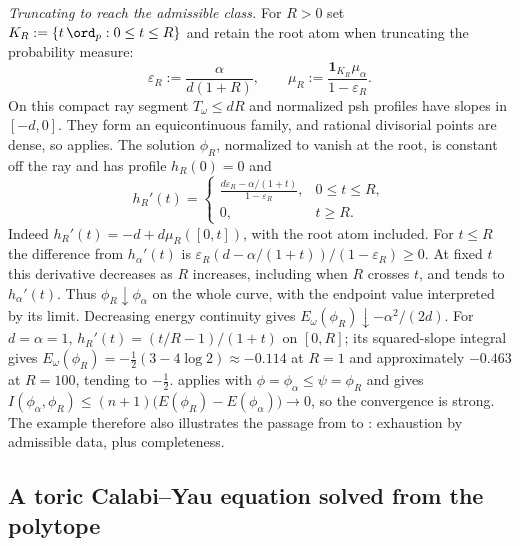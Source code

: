 \begin{example}[Solving $\MA_\omega(\phi)=\mu$ on $\mathbf P^1$ by hand]
\emph{Truncating to reach the admissible class.} For $R>0$ set
$K_R:=\{t\,\ord_p:0\le t\le R\}$ and retain the root atom when
truncating the probability measure:
\[
 \varepsilon_R:=\frac{\alpha}{d(1+R)},\qquad
 \mu_R:=\frac{\mathbf1_{K_R}\mu_\alpha}{1-\varepsilon_R}.
\]
On this compact ray segment $T_\omega\le dR$ and normalized psh
profiles have slopes in $[-d,0]$. They form an equicontinuous family,
and rational divisorial points are dense, so
 applies.
The solution $\phi_R$, normalized to vanish at the root, is constant
off the ray and has profile $h_R(0)=0$ and
\[
 h_R'(t)=
 \begin{cases}
 \displaystyle\frac{d\varepsilon_R-\alpha/(1+t)}{1-\varepsilon_R},
      &0\le t\le R,\\[6pt]
 0,&t\ge R.
 \end{cases}
\]
Indeed $h_R'(t)=-d+d\mu_R([0,t])$, with the root atom included.
For $t\le R$ the difference from $h_\alpha'(t)$ is
$\varepsilon_R(d-\alpha/(1+t))/(1-\varepsilon_R)\ge0$.
At fixed $t$ this derivative decreases as $R$ increases, including
when $R$ crosses $t$, and tends to $h_\alpha'(t)$.
Thus $\phi_R\downarrow\phi_\alpha$ on the whole curve, with the
endpoint value interpreted by its limit. Decreasing energy
continuity gives $E_\omega(\phi_R)\downarrow-\alpha^2/(2d)$.
For $d=\alpha=1$, $h_R'(t)=(t/R-1)/(1+t)$ on $[0,R]$;
its squared-slope integral gives
$E_\omega(\phi_R)=-\tfrac12(3-4\log2)\approx-0.114$ at $R=1$
and approximately $-0.463$ at $R=100$, tending to $-\tfrac12$.
 applies with
$\phi=\phi_\alpha\le\psi=\phi_R$ and gives
$I(\phi_\alpha,\phi_R)\le(n+1)\bigl(E(\phi_R)-E(\phi_\alpha)\bigr)\to0$,
so the convergence is strong.  The example
therefore also illustrates the passage from
 to
: exhaustion by admissible data, plus
completeness.
\end{example}

\subsection{A toric Calabi--Yau equation solved from the polytope}
\label{sec:ch47-ex-toric}

